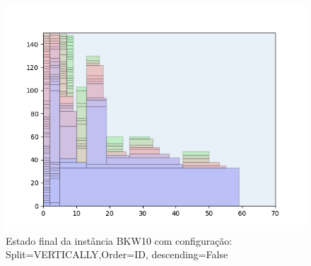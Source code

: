 \begin{figure}[H]
    \centering
    \caption[]{Estado final da instância BKW10 com configuração: Split=VERTICALLY,Order=ID, descending=False}
    \label{fig:bkw10-vertically-id-false}
    \includegraphics[scale=0.5]{output/figures/bkw/bkw10/vertically/id/false/000}
\end{figure}
